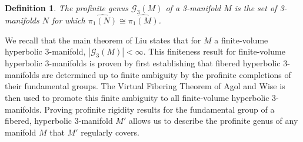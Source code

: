 \documentclass[12pt, reqno,oneside]{amsart}
\newtheorem{defn}[lemma]{Definition}
\theoremstyle{definition}
\theoremstyle{plain}
\theoremstyle{TheoremNum}
\numberwithin{equation}{section}
\numberwithin{table}{section}
\begin{document}
\begin{defn}\label{profgenus}
    The profinite genus $\mathcal{G}_3(M)$ of a 3-manifold $M$ is the set of 3-manifolds $N$ for which $\widehat{\pi_1(N)}\cong\widehat{\pi_1(M)}$.
\end{defn}
We recall that the main theorem of Liu \cite{Y} states that for $M$ a finite-volume hyperbolic 3-manifold, $|\mathcal{G}_3(M)|<\infty$. This finiteness result for finite-volume hyperbolic 3-manifolds is proven by first establishing that fibered hyperbolic 3-manifolds are determined up to finite ambiguity by the profinite completions of their fundamental groups. The Virtual Fibering Theorem of Agol and Wise \cite{AgolHaken}\cite{WiseHaken} is then used to promote this finite ambiguity to all finite-volume hyperbolic 3-manifolds. Proving profinite rigidity results for the fundamental group of a fibered, hyperbolic 3-manifold $M'$ allows us to describe the profinite genus of any manifold $M$ that $M'$ regularly covers.  
\end{document}
